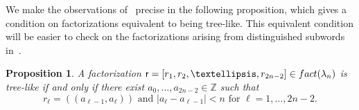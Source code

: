 \documentclass[a4paper,10pt,leqno]{amsart}
\numberwithin{equation}{section}
\newtheorem{proposition}[theorem]{Proposition}
\theoremstyle{definition}
\theoremstyle{remark}
\newcommand{\Fact}{\textsc{fact}}
\newcommand{\rr}{\mathsf{r}}
\newcommand{\rrr}{r}
\begin{document}
We make the observations of~ precise in the following proposition, 
which gives a condition on factorizations equivalent to being tree-like.  This equivalent condition will be easier to check on the factorizations arising from distinguished subwords in~.   

\begin{proposition}
\label{connection}
    A factorization $\rr = \left[ \rrr_1,\rrr_2,\ldots,\rrr_{2n-2}\right] \in \Fact(\lambda_n)$ is tree-like if and only if there exist $a_0,\dots,a_{2n-2} \in \mathbb{Z}$ such that
\begin{equation}\label{eq:cond3}\rrr_\ell = (\!(a_{\ell - 1}, a_\ell)\!) \text{ and }
   |a_\ell - a_{\ell - 1}| < n \text{ for } \ell = 1,\dots,2n-2.\end{equation}
\end{proposition}
\end{document}
